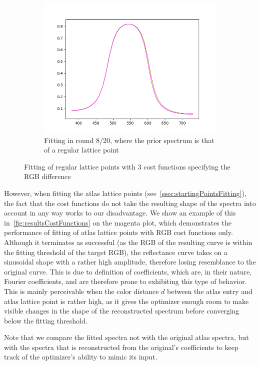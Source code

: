 \begin{figure}[t]
\begin{subfigure}[t]{0.45\textwidth}
		\includegraphics[width=\linewidth,height=0.2\textheight]{img/cost_functions_regular_round8.png}
		\caption{Fitting in round 8/20, where the prior spectrum is that of a regular lattice point}
		\label{fig:costFunctionsRegularRound8}
	\end{subfigure} 
	\caption{Fitting of regular lattice points with 3 cost functions specifying the RGB difference}
	\label{fig:costFunctionsRegularFitting}
\end{figure}

However, when fitting the atlas lattice points (see~\cref{ssec:startingPointsFitting}), the fact that the cost functions do not take the resulting shape of the spectra into account in any way works to our disadvantage. We show an example of this in~\cref{fig:resultsCostFunctions} on the magenta plot, which demonstrates the performance of fitting of atlas lattice points with RGB cost functions only. Although it terminates as successful (as the RGB of the resulting curve is within the fitting threshold of the target RGB), the reflectance curve takes on a sinusoidal shape with a rather high amplitude, therefore losing resemblance to the original curve. This is due to definition of coefficients, which are, in their nature, Fourier coefficients, and are therefore prone to exhibiting this type of behavior. This is mainly perceivable when the color distance $d$ between the atlas entry and atlas lattice point is rather high, as it gives the optimizer enough room to make visible changes in the shape of the reconstructed spectrum before converging below the fitting threshold.
 
Note that we compare the fitted spectra not with the original atlas spectra, but with the spectra that is reconstructed from the original's coefficients to keep track of the optimizer's ability to mimic its input.

